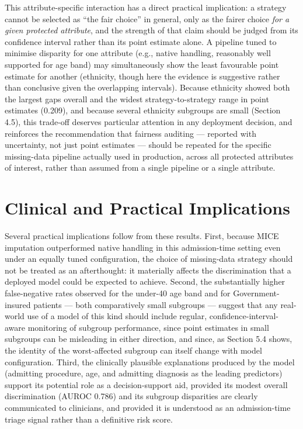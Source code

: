 \documentclass[12pt,a4paper]{report}
\begin{document}
This attribute-specific interaction has a direct practical implication: a strategy cannot be selected as ``the fair choice'' in general, only as the fairer choice \emph{for a given protected attribute}, and the strength of that claim should be judged from its confidence interval rather than its point estimate alone. A pipeline tuned to minimise disparity for one attribute (e.g., native handling, reasonably well supported for age band) may simultaneously show the least favourable point estimate for another (ethnicity, though here the evidence is suggestive rather than conclusive given the overlapping intervals). Because ethnicity showed both the largest gaps overall and the widest strategy-to-strategy range in point estimates (0.209), and because several ethnicity subgroups are small (Section 4.5), this trade-off deserves particular attention in any deployment decision, and reinforces the recommendation that fairness auditing --- reported with uncertainty, not just point estimates --- should be repeated for the specific missing-data pipeline actually used in production, across all protected attributes of interest, rather than assumed from a single pipeline or a single attribute.


\section{Clinical and Practical Implications}
Several practical implications follow from these results. First, because MICE imputation outperformed native handling in this admission-time setting even under an equally tuned configuration, the choice of missing-data strategy should not be treated as an afterthought: it materially affects the discrimination that a deployed model could be expected to achieve. Second, the substantially higher false-negative rates observed for the under-40 age band and for Government-insured patients --- both comparatively small subgroups --- suggest that any real-world use of a model of this kind should include regular, confidence-interval-aware monitoring of subgroup performance, since point estimates in small subgroups can be misleading in either direction, and since, as Section 5.4 shows, the identity of the worst-affected subgroup can itself change with model configuration. Third, the clinically plausible explanations produced by the model (admitting procedure, age, and admitting diagnosis as the leading predictors) support its potential role as a decision-support aid, provided its modest overall discrimination (AUROC 0.786) and its subgroup disparities are clearly communicated to clinicians, and provided it is understood as an admission-time triage signal rather than a definitive risk score.
\end{document}
